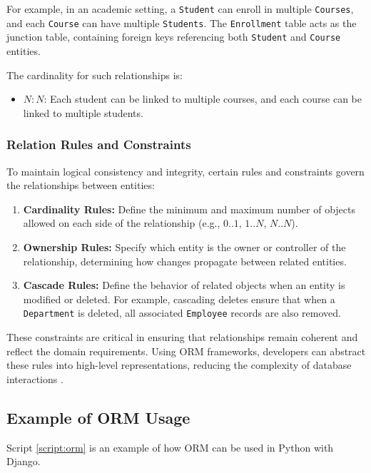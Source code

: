 For example, in an academic setting, a \texttt{Student} can enroll in multiple \texttt{Courses}, and each \texttt{Course} can have multiple \texttt{Students}. The \texttt{Enrollment} table acts as the junction table, containing foreign keys referencing both \texttt{Student} and \texttt{Course} entities.

The cardinality for such relationships is:
\begin{itemize}
    \item \(N:N\): Each student can be linked to multiple courses, and each course can be linked to multiple students.
\end{itemize}

\subsubsection{Relation Rules and Constraints}

To maintain logical consistency and integrity, certain rules and constraints govern the relationships between entities:
\begin{enumerate}
    \item \textbf{Cardinality Rules:} Define the minimum and maximum number of objects allowed on each side of the relationship (e.g., \(0..1\), \(1..N\), \(N..N\)).
    \item \textbf{Ownership Rules:} Specify which entity is the owner or controller of the relationship, determining how changes propagate between related entities.
    \item \textbf{Cascade Rules:} Define the behavior of related objects when an entity is modified or deleted. For example, cascading deletes ensure that when a \texttt{Department} is deleted, all associated \texttt{Employee} records are also removed.
\end{enumerate}

These constraints are critical in ensuring that relationships remain coherent and reflect the domain requirements. Using ORM frameworks, developers can abstract these rules into high-level representations, reducing the complexity of database interactions \cite{larman2004applying}.


\subsection{Example of ORM Usage}
Script \ref{script:orm} is an example of how ORM can be used in Python with Django.


